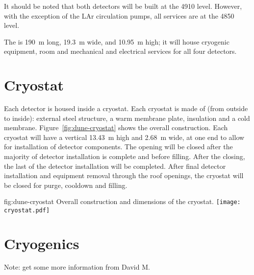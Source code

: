It should be noted that both detectors will be built at the 4910
level. However, with the exception of the LAr circulation pumps, all
services are at the 4850 level.

The  is \SI{190}{\meter} long, \SI{19.3}{\meter}
wide, and \SI{10.95}{\meter} high; it will house cryogenic equipment, 
room and mechanical and electrical services for all four
detectors.

\section{Cryostat}
\label{sec:fdsp-coord-cryostat}

Each detector is housed inside a cryostat. Each cryostat is made of
(from outside to inside): external steel structure, a warm membrane
plate, insulation and a cold membrane. Figure~\ref{fig:dune-cryostat}
shows the overall construction. Each cryostat will have a vertical
 \SI{13.43}{\meter} high and \SI{2.68}{\meter}
wide, at one end to allow for installation of detector components. The
opening will be closed after the majority of detector installation is
complete and before filling. After the  closing, the last of the
detector installation will be completed. After final detector
installation and equipment removal through the roof openings, the
cryostat will be closed for purge, cooldown and filling.
\begin{dunefigure}{fig:dune-cryostat}
  {Overall construction and dimensions of the  cryostat.}
  \texttt{[image: cryostat.pdf]}
\end{dunefigure}

\section{Cryogenics}
\label{sec:fdsp-coord-cryogenics}

Note: get some more information from David M.


